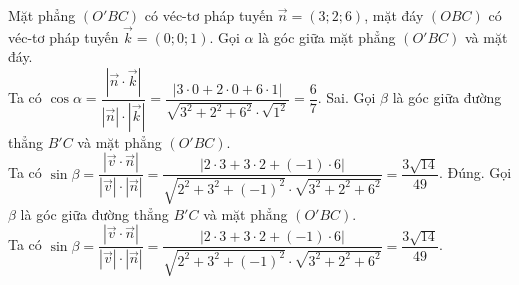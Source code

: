 \begin{ex}
{\begin{itemchoice}
		Mặt phẳng $(O'BC)$ có véc-tơ pháp tuyến $\overrightarrow{n}=(3;2;6)$, mặt đáy $(OBC)$ có véc-tơ pháp tuyến $\overrightarrow{k}=(0;0;1)$. Gọi $\alpha$ là góc giữa mặt phẳng $(O'BC)$ và mặt đáy.\\
		Ta có $\cos\alpha =\dfrac{\left |\overrightarrow{n}\cdot\overrightarrow{k} \right |}{\left |\overrightarrow{n} \right |\cdot\left |\overrightarrow{k} \right |}=\dfrac{\left |3\cdot 0+2\cdot 0+6\cdot 1 \right |}{\sqrt{3^2+2^2+6^2}\cdot\sqrt{1^2}}=\dfrac{6}{7}$.
		\itemch Sai. Gọi $\beta$ là góc giữa đường thẳng $B'C$ và mặt phẳng $(O'BC)$.\\
		Ta có $\sin\beta =\dfrac{\left |\overrightarrow{v}\cdot\overrightarrow{n} \right |}{\left |\overrightarrow{v} \right |\cdot\left |\overrightarrow{n} \right |}=\dfrac{\left |2\cdot 3+3\cdot 2+(-1)\cdot 6 \right |}{\sqrt{2^2+3^2+(-1)^2}\cdot\sqrt{3^2+2^2+6^2}}=\dfrac{3\sqrt{14}}{49}$.
		\itemch Đúng. Gọi $\beta$ là góc giữa đường thẳng $B'C$ và mặt phẳng $(O'BC)$.\\
		Ta có $\sin\beta =\dfrac{\left |\overrightarrow{v}\cdot\overrightarrow{n} \right |}{\left |\overrightarrow{v} \right |\cdot\left |\overrightarrow{n} \right |}=\dfrac{\left |2\cdot 3+3\cdot 2+(-1)\cdot 6 \right |}{\sqrt{2^2+3^2+(-1)^2}\cdot\sqrt{3^2+2^2+6^2}}=\dfrac{3\sqrt{14}}{49}$.
	\end{itemchoice}
	}
\end{ex}

